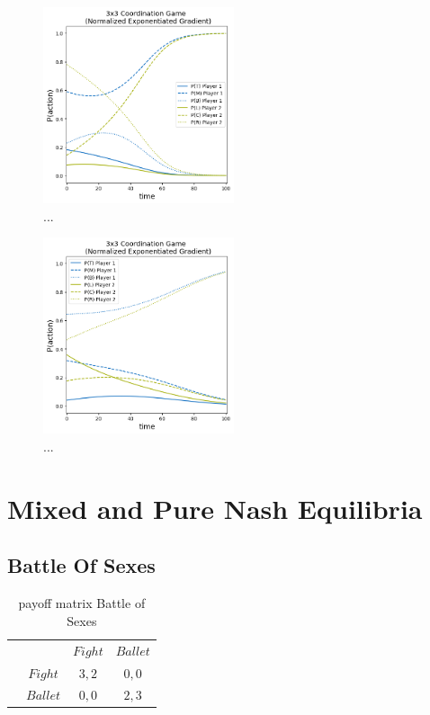 \begin{figure}
    \centering
    \includegraphics[width=0.5\textwidth]{logos/Coordination3x3-2.png}
    \caption{...}
    \label{Coordination3x3-2}
\end{figure}

\begin{figure}
    \centering
    \includegraphics[width=0.5\textwidth]{logos/Coordination3x3-3.png}
    \caption{...}
    \label{Coordination3x3-3}
\end{figure}


\section{Mixed and Pure Nash Equilibria}\label{section:MixedandPureNashEquilibria}

\subsection{Battle Of Sexes}\label{subsection:battleOfSexes}

\begin{table}\centering
\setlength{\extrarowheight}{2pt}
\begin{tabular}{cc|c|c|}
  & \multicolumn{1}{c}{} & \multicolumn{1}{c}{$Fight$}  & \multicolumn{1}{c}{$Ballet$} \\\cline{3-4}
  & $Fight$ & $3,2$ & $0,0$ \\\cline{3-4}
  & $Ballet$ & $0,0$ & $2,3$ \\\cline{3-4}
\end{tabular}\caption{\label{tab:payoffBattleOfSexes}payoff matrix Battle of Sexes}
\end{table}

